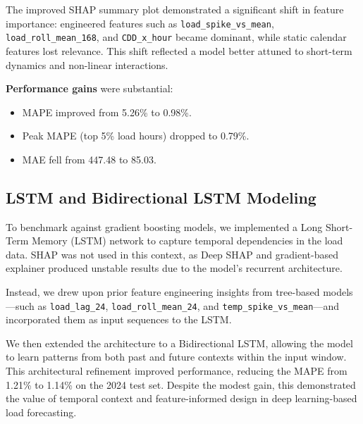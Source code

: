 \documentclass{ifacconf}
\begin{document}
The improved SHAP summary plot demonstrated a significant shift in feature importance: engineered features such as \texttt{load\_spike\_vs\_mean}, \texttt{load\_roll\_mean\_168}, and \texttt{CDD\_x\_hour} became dominant, while static calendar features lost relevance. This shift reflected a model better attuned to short-term dynamics and non-linear interactions.

\textbf{Performance gains} were substantial:
\begin{itemize}
    \item MAPE improved from 5.26\% to 0.98\%.
    \item Peak MAPE (top 5\% load hours) dropped to 0.79\%.
    \item MAE fell from 447.48 to 85.03.
\end{itemize}



\subsection*{LSTM and Bidirectional LSTM Modeling}

To benchmark against gradient boosting models, we implemented a Long Short-Term Memory (LSTM) network to capture temporal dependencies in the load data. SHAP was not used in this context, as Deep SHAP and gradient-based explainer produced unstable results due to the model's recurrent architecture.

Instead, we drew upon prior feature engineering insights from tree-based models—such as \texttt{load\_lag\_24}, \texttt{load\_roll\_mean\_24}, and \texttt{temp\_spike\_vs\_mean}—and incorporated them as input sequences to the LSTM.

We then extended the architecture to a Bidirectional LSTM, allowing the model to learn patterns from both past and future contexts within the input window. This architectural refinement improved performance, reducing the MAPE from 1.21\% to 1.14\% on the 2024 test set. Despite the modest gain, this demonstrated the value of temporal context and feature-informed design in deep learning-based load forecasting.
\end{document}
